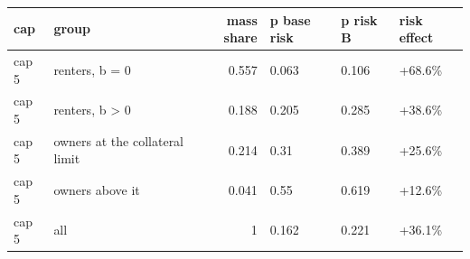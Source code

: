 \begingroup\small
\setlength{\tabcolsep}{3pt}
\renewcommand{\arraystretch}{1.04}
\begin{tabularx}{\linewidth}{XXrXXX}
\toprule
cap & group & mass share & p base risk & p risk B & risk effect \\
\midrule
cap 5 & renters, b = 0 & 0.557 & 0.063 & 0.106 & +68.6\% \\
cap 5 & renters, b \textgreater{} 0 & 0.188 & 0.205 & 0.285 & +38.6\% \\
cap 5 & owners at the collateral limit & 0.214 & 0.31 & 0.389 & +25.6\% \\
cap 5 & owners above it & 0.041 & 0.55 & 0.619 & +12.6\% \\
cap 5 & all & 1 & 0.162 & 0.221 & +36.1\% \\
\bottomrule
\end{tabularx}
\endgroup
